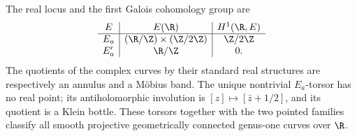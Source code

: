 \begin{theorem}\label{A7-real-topology}
The real locus and the first Galois cohomology group are
\[
 \begin{array}{c|c|c}
 E & E(\R) & H^1(\R,E)\\\hline
 E_a & (\R/\Z)\times(\Z/2\Z) & \Z/2\Z\\
 E'_a & \R/\Z & 0.
 \end{array}
\]
The quotients of the complex curves by their standard real structures are respectively an annulus and a M\"obius band. The unique nontrivial $E_a$-torsor has no real point; its antiholomorphic involution is $[z]\mapsto[\bar{z}+1/2]$, and its quotient is a Klein bottle. These torsors together with the two pointed families classify all smooth projective geometrically connected genus-one curves over $\R$.
\end{theorem}
